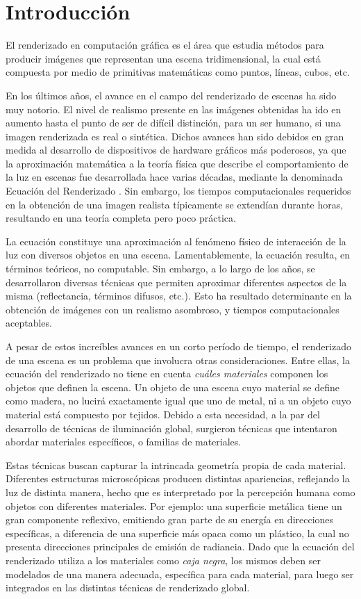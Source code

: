 \chapter{Introducción}
El renderizado en computación gráfica es el área que estudia métodos para producir imágenes que representan una escena tridimensional, la cual está compuesta por medio de primitivas matemáticas como puntos, líneas, cubos, etc.

En los últimos años, el avance en el campo del renderizado de escenas ha sido muy notorio. 
El nivel de realismo presente en las imágenes obtenidas ha ido en aumento hasta el punto de ser de difícil distinción, para un ser humano, si una imagen renderizada es real o sintética.
Dichos avances han sido debidos en gran medida al desarrollo de dispositivos de hardware gráficos más poderosos, ya que la aproximación matemática a la teoría física que describe el comportamiento de la luz en escenas fue desarrollada hace varias décadas, mediante la denominada Ecuación del Renderizado \cite{Kajiya1986}.
Sin embargo, los tiempos computacionales requeridos en la obtención de una imagen realista típicamente se extendían durante horas, resultando en una teoría completa pero poco práctica. 

La ecuación constituye una aproximación al fenómeno físico de interacción de la luz con diversos objetos en una escena.
Lamentablemente, la ecuación resulta, en términos teóricos, no computable.
Sin embargo, a lo largo de los años, se desarrollaron diversas técnicas que permiten aproximar diferentes aspectos de la misma (reflectancia, términos difusos, etc.).
Esto ha resultado determinante en la obtención de imágenes con un realismo asombroso, y tiempos computacionales aceptables.

A pesar de estos increíbles avances en un corto período de tiempo, el renderizado de una escena es un problema que involucra otras consideraciones.
Entre ellas, la ecuación del renderizado no tiene en cuenta {\em cuáles materiales} componen los objetos que definen la escena.
Un objeto de una escena cuyo material se define como madera, no lucirá exactamente igual que uno de metal, ni a un objeto cuyo material está compuesto por tejidos.
Debido a esta necesidad, a la par del desarrollo de técnicas de iluminación global, surgieron técnicas que intentaron abordar materiales específicos, o familias de materiales.

Estas técnicas buscan capturar la intrincada geometría propia de cada material.
Diferentes estructuras microscópicas producen distintas apariencias, reflejando la luz de distinta manera, hecho que es interpretado por la percepción humana como objetos con diferentes materiales.
Por ejemplo: una superficie metálica tiene un gran componente reflexivo, emitiendo gran parte de su energía en direcciones específicas, a diferencia de una superficie más opaca como un plástico, la cual no presenta direcciones principales de emisión de radiancia.
Dado que la ecuación del renderizado utiliza a los materiales como {\em caja negra}, los mismos deben ser modelados de una manera adecuada, específica para cada material, para luego ser integrados en las distintas técnicas de renderizado global.

